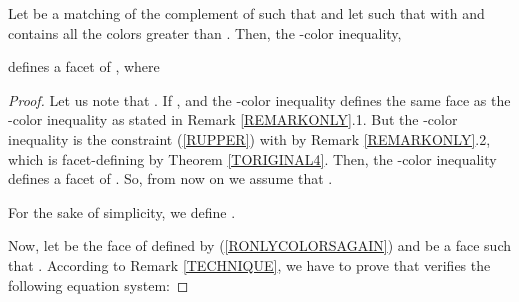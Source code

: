 \begin{tthm} \label{TONLYCOLORS}
Let  be a matching of the complement of  such that 
and let  such that  with  and  contains all the colors
greater than . Then, the -color inequality, \ie

defines a facet of , where

\end{tthm}
\begin{proof}
Let us note that . If ,  and the -color inequality defines the same
face as the -color inequality as stated in Remark \ref{REMARKONLY}.1. But the -color inequality
is the constraint (\ref{RUPPER}) with  by Remark \ref{REMARKONLY}.2, which is facet-defining by Theorem \ref{TORIGINAL4}. Then, the -color inequality defines a facet of . So, from now on we assume that
.

For the sake of simplicity, we define .

Now, let  be the face of  defined by (\ref{RONLYCOLORSAGAIN}) and
 be a face such that .
According to Remark \ref{TECHNIQUE}, we have to prove that  verifies the following equation system: 


\end{proof}
